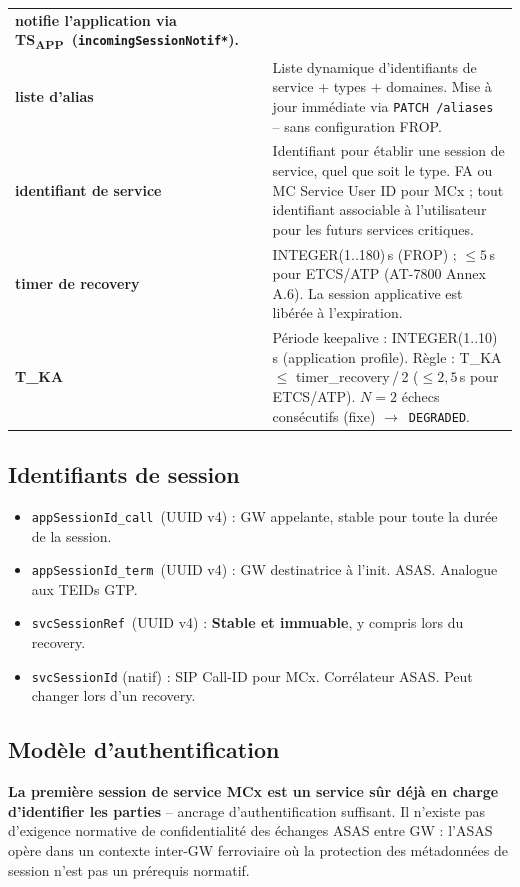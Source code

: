 \documentclass[11pt,a4paper]{article}
\newcommand{\TSAPP}{TS\textsubscript{APP}}
\newcommand{\arr}{$\to$}
\newcommand{\svcref}{\texttt{svcSessionRef}}
\newcommand{\appcall}{\texttt{appSessionId\_call}}
\newcommand{\appterm}{\texttt{appSessionId\_term}}
\begin{document}
\begin{longtable}{>{\bfseries}p{3.8cm} p{10.5cm}}
    notifie l'application via \TSAPP\ (\texttt{incomingSessionNotif*}). \\[0.3em]
  liste d'alias & Liste dynamique d'identifiants de service + types + domaines.
    Mise à jour immédiate via \texttt{PATCH /aliases} -- sans configuration FROP. \\[0.3em]
  identifiant de service & Identifiant pour établir une session de service, quel
    que soit le type. FA ou MC Service User ID pour MCx ; tout identifiant
    associable à l'utilisateur pour les futurs services critiques. \\[0.3em]
  timer de recovery & INTEGER(1..180)\,s (FROP) ; $\leq 5$\,s pour ETCS/ATP
    (AT-7800 Annex A.6). La session applicative est libérée à l'expiration. \\[0.3em]
  T\_KA & Période keepalive : INTEGER(1..10)\,s (application profile).
    Règle : T\_KA $\leq$ timer\_recovery\,/\,2 ($\leq 2,5$\,s pour ETCS/ATP).
    $N = 2$ échecs consécutifs (fixe) \arr\ \texttt{DEGRADED}. \\
  \bottomrule
\end{longtable}

\subsection{Identifiants de session}

\begin{itemize}[leftmargin=2em]
  \item \appcall\ (UUID v4) : GW appelante, stable pour toute la durée de la session.
  \item \appterm\ (UUID v4) : GW destinatrice à l'init. ASAS. Analogue aux TEIDs GTP.
  \item \svcref\ (UUID v4) : \textbf{Stable et immuable}, y compris lors du recovery.
  \item \texttt{svcSessionId} (natif) : SIP Call-ID pour MCx. Corrélateur ASAS.
    Peut changer lors d'un recovery.
\end{itemize}

\subsection{Modèle d'authentification}
\label{sec:trust}

\textbf{La première session de service MCx est un service sûr déjà en charge
d'identifier les parties} -- ancrage d'authentification suffisant. Il n'existe pas
d'exigence normative de confidentialité des échanges ASAS entre GW : l'ASAS opère
dans un contexte inter-GW ferroviaire où la protection des métadonnées de session
n'est pas un prérequis normatif.
\end{document}
